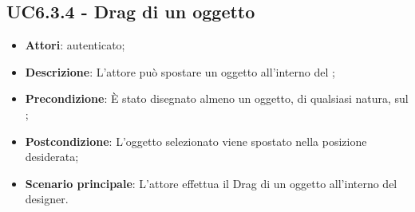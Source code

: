 \subsection{UC6.3.4 - Drag di un oggetto}
\label{ssec:UC6.3.4}
\begin{itemize}
\item \textbf{Attori}:  autenticato;
\item \textbf{Descrizione}: L'attore può spostare un oggetto all'interno del ;
\item \textbf{Precondizione}: È stato disegnato almeno un oggetto, di qualsiasi natura, sul ;
\item \textbf{Postcondizione}: L'oggetto selezionato viene spostato nella posizione desiderata;
\item \textbf{Scenario principale}: L'attore effettua il Drag di un oggetto all'interno del designer.
\end{itemize}
\newpage
